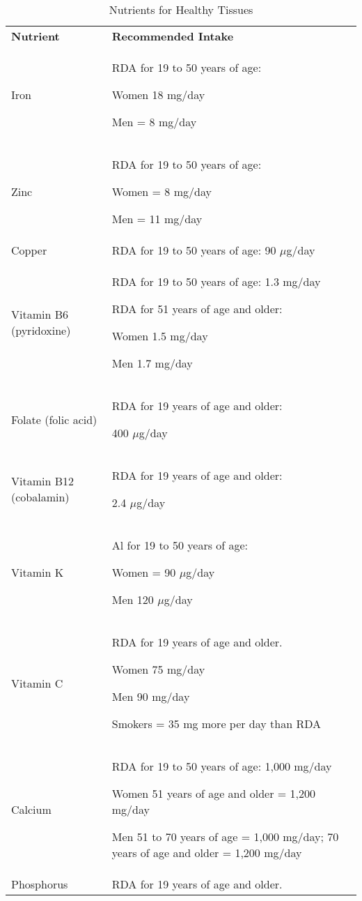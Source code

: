\documentclass[title={Chapter 9}]{fdsn201notes}
\begin{document}
%
%
%
%
\begin{table}[H]
	\centering
	\begin{threeparttable}
		\caption{Nutrients for Healthy Tissues}
		\label{tab:healthy-nutrient-tissues}
		\begin{tabular}{p{} p{}}
			\rowcolor{rowdarkgreen}\textbf{Nutrient} & \textbf{Recommended Intake}\\
			Iron & RDA for 19 to 50 years of age:

			Women 18 mg/day

			Men = 8 mg/day\\
			Zinc & RDA for 19 to 50 years of age:

			Women = 8 mg/day

			Men = 11 mg/day\\
			Copper & RDA for 19 to 50 years of age: 90 $\mu$g/day\\
			Vitamin B6 (pyridoxine) & RDA for 19 to 50 years of age: 1.3 mg/day

			RDA for 51 years of age and older:

			Women 1.5 mg/day

			Men 1.7 mg/day \\
			Folate (folic acid) & RDA for 19 years of age and older:

			400 $\mu$g/day \\
			Vitamin B12 (cobalamin) & RDA for 19 years of age and older:

			2.4 $\mu$g/day\\
			Vitamin K & Al for 19 to 50 years of age:

			Women = 90 $\mu$g/day

			Men 120 $\mu$g/day\\
			Vitamin C & RDA for 19 years of age and older.

			Women 75 mg/day

			Men 90 mg/day

			Smokers = 35 mg more per day than RDA\\
			Calcium & RDA for 19 to 50 years of age: 1,000 mg/day

			Women 51 years of age and older = 1,200 mg/day

			Men 51 to 70 years of age = 1,000 mg/day; 70 years of age and older = 1,200 mg/day\\
			Phosphorus & RDA for 19 years of age and older.


\end{tabular}
\end{threeparttable}
\end{table}
\end{document}
